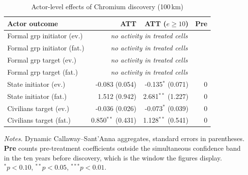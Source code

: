 \begin{table}[H]
\centering
\footnotesize
\caption{Actor-level effects of Chromium discovery (100\,km)}
\label{tab:mech_chromium}
\begin{tabular}{lrrr}
\toprule
\textbf{Actor outcome} & \textbf{ATT} & \textbf{ATT ($e\geq10$)} & \textbf{Pre} \\
\midrule
Formal grp initiator (ev.) & \multicolumn{3}{c}{\textit{no activity in treated cells}} \\
Formal grp initiator (fat.) & \multicolumn{3}{c}{\textit{no activity in treated cells}} \\
Formal grp target (ev.) & \multicolumn{3}{c}{\textit{no activity in treated cells}} \\
Formal grp target (fat.) & \multicolumn{3}{c}{\textit{no activity in treated cells}} \\
State initiator (ev.) & -0.083 (0.054) & -0.135$^{*}$ (0.071) & 0 \\
State initiator (fat.) & 1.512 (0.942) & 2.681$^{**}$ (1.227) & 0 \\
Civilians target (ev.) & -0.036 (0.026) & -0.073$^{*}$ (0.039) & 0 \\
Civilians target (fat.) & 0.850$^{**}$ (0.431) & 1.128$^{**}$ (0.541) & 0 \\
\bottomrule
\end{tabular}
\begin{minipage}{0.9\textwidth}\vspace{4pt}\scriptsize \textit{Notes.} Dynamic Callaway--Sant'Anna aggregates, standard errors in parentheses. \textbf{Pre} counts pre-treatment coefficients outside the simultaneous confidence band in the ten years before discovery, which is the window the figures display. $^{*}p<0.10$, $^{**}p<0.05$, $^{***}p<0.01$.\end{minipage}
\end{table}
